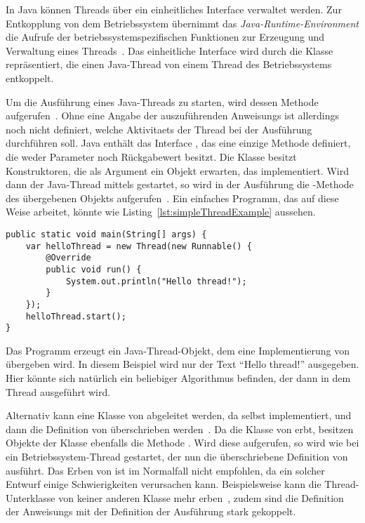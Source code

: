 In Java können Threads über ein einheitliches Interface verwaltet werden. Zur Entkopplung von dem Betriebssystem übernimmt das \emph{Java-Runtime-Environment} die Aufrufe der betriebssystemspezifischen Funktionen zur Erzeugung und Verwaltung eines Threads~\cite[S.~3]{Friesen2015}. Das einheitliche Interface wird durch die Klasse \classThread{} repräsentiert, die einen Java-Thread von einem Thread des  Betriebssystems entkoppelt. 

Um die Ausführung eines Java-Threads zu starten, wird dessen Methode  aufgerufen~\cite[S.~8]{Friesen2015}. Ohne eine Angabe der auszuführenden \glspl{Anweisung} ist allerdings noch nicht definiert, welche \glspl{Aktivitaet} der Thread bei der Ausführung durchführen soll. Java enthält das Interface \classRunnable{}, das eine einzige Methode  definiert, die weder Parameter noch Rückgabewert besitzt. Die Klasse \classThread{} besitzt Konstruktoren, die als Argument ein Objekt erwarten, das \classRunnable{} implementiert. Wird dann der Java-Thread mittels  gestartet, so wird in der Ausführung die -Methode des übergebenen Objekts aufgerufen~\cite[S.~3]{Friesen2015}. Ein einfaches \gls{Programm}, das auf diese Weise arbeitet, könnte wie Listing~\ref{lst:simpleThreadExample} aussehen.
\begin{lstlisting}[caption={[Beispiel für ein Java-\glsentrylong{Programm}, das einen mit einem \classRunnable{}-Objekt einen Thread erzeugt und dann startet.]Beispiel für ein Java-\gls{Programm} das einen mit einem \classRunnable{}-Objekt einen Thread erzeugt und dann startet.},label={lst:simpleThreadExample},float={htbp}]
public static void main(String[] args) {
	var helloThread = new Thread(new Runnable() {
		@Override
		public void run() {
			System.out.println("Hello thread!");
		}
	});
	helloThread.start();
}
\end{lstlisting}
Das \gls{Programm} erzeugt ein Java-Thread-Objekt, dem eine Implementierung von \classRunnable{} übergeben wird. In diesem Beispiel wird nur der Text \enquote{Hello thread!} ausgegeben. Hier könnte sich natürlich ein beliebiger Algorithmus befinden, der dann in dem Thread ausgeführt wird.

Alternativ kann eine Klasse von \classThread{} abgeleitet werden, da \classThread{} selbst \classRunnable{} implementiert, und dann die Definition von  überschrieben werden~\cite[S.~335]{Rauber2006}. Da die Klasse von \classThread{} erbt, besitzen Objekte der Klasse ebenfalls die Methode . Wird diese aufgerufen, so wird wie bei \classThread{} ein Betriebssystem-Thread gestartet, der nun die überschriebene Definition von  ausführt. Das Erben von \classThread{} ist im Normalfall nicht empfohlen, da ein solcher Entwurf einige Schwierigkeiten verursachen kann. Beispielsweise kann die Thread-Unterklasse von keiner anderen Klasse mehr erben~\cite[S.~335]{Rauber2006}, zudem sind die Definition der \glspl{Anweisung} mit der Definition der Ausführung stark gekoppelt.

